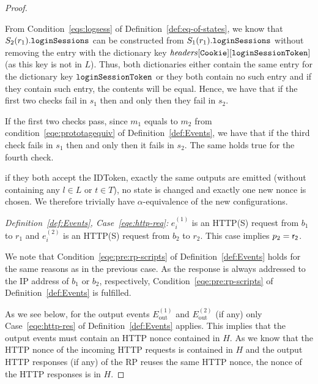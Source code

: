 \begin{proof}
\begin{itemize}
        From Condition~\ref{eqs:logsess} of
        Definition~\ref{def:eq-of-states}, we know that
        $S_2(r_1).\mathtt{loginSessions}$ can be constructed from
        $S_1(r_1).\mathtt{loginSessions}$ without removing the 
        entry with the dictionary key 
        $\mathit{headers}[\mathtt{Cookie}][\mathtt{loginSessionToken}]$ 
        (as this key is not in $L$). Thus, both dictionaries 
        either contain the same entry for the dictionary key
        $\mathtt{loginSessionToken}$ or they both contain no
        such entry and if they contain such entry, the contents
        will be equal. Hence, we have that if the first two 
        checks fail in $s_1$ then and only then they fail in $s_2$.
  
        If the first two checks pass, since $m_1$ equals to $m_2$ 
        from condition~\ref{eqe:prototagequiv} of 
        Definition~\ref{def:Events}, we have that if the third 
        check fails in $s_1$ then and only then it fails in $s_2$. 
        The same holds true for the fourth check.
  
        if they both accept the IDToken, exactly the 
        same outputs are emitted (without containing any 
        $l\in L$ or $t \in T$), no state is changed and exactly 
        one new nonce is chosen. We therefore trivially have
        $\alpha$-equivalence of the new configurations.
    \end{itemize}
  
    \noindent \emph{Definition~\ref{def:Events}, Case~\ref{eqe:http-req}:} 
    $e_i^{(1)}$ is an HTTP(S) request from $b_1$ to $r_1$ and 
    $e_i^{(2)}$ is an HTTP(S) request from $b_2$ to $r_2$. 
    This case implies $p_2 = \mathsf{r_2}$.
  
    We note that Condition~\ref{eqe:pre:rp-scripts} of 
    Definition~\ref{def:Events} holds for the same reasons as in
    the previous case. As the response is always addressed to 
    the IP address of $b_1$ or $b_2$, respectively,
    Condition~\ref{eqe:pre:rp-scripts} of
    Definition~\ref{def:Events} is fulfilled. 
  
    As we see below, for the output events $E^{(1)}_\text{out}$ 
    and $E^{(2)}_\text{out}$ (if any) only Case~\ref{eqe:http-res} 
    of Definition~\ref{def:Events} applies. This implies that the
    output events must contain an HTTP nonce contained in $H$. As 
    we know that the HTTP nonce of the incoming HTTP requests is 
    contained in $H$ and the output HTTP responses (if any) of the 
    RP reuses the same HTTP nonce, the nonce of the HTTP responses 
    is in $H$.
  

\end{proof}
